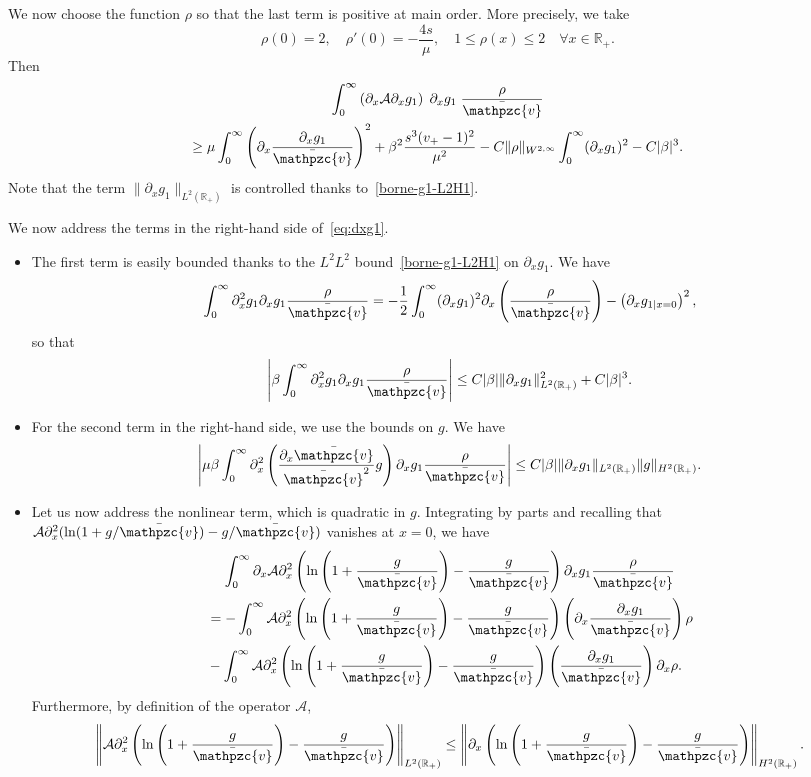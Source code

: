 \documentclass[AHL,Unicode,longabstracts,published]{cedram}
\newcommand{\R}{\mathbb{R}}
\newcommand{\p}{\partial}
\newcommand{\bv}{\bar{\mathpzc{v}}}
\newcommand{\cA}{\mathcal A}
\let\oldforall\forall
\renewcommand*{\forall}{\mathrel{\oldforall}}
\begin{document}
We now choose the function $\rho$ so that the last term is positive at main order. More precisely, we take
\[
\rho(0)=2,\quad \rho'(0)=-\frac{4s}{\mu},\quad 1\leq \rho(x)\leq 2\quad \forall x\in \R_+.
\]
Then
\begin{multline}\label{eq:diffu_pxg1}
\int_0^\infty \left(\p_x \cA \p_x g_1\right) \;\p_x g_1 \; \frac{\rho}{\bv }\\
\geq \mu \int_0^\infty \left(\p_x \frac{\p_x g_1}{\bv}\right)^2 + \beta^2\frac{s^3(v_+-1)^2}{\mu^2} - C \|\rho\|_{W^{2,\infty}}\int_0^\infty (\p_x g_1)^2 - C|\beta|^3.
\end{multline}
Note that the term $\|\p_x g_1\|_{L^2(\mathbb R_+)}$ is controlled thanks to~\eqref{borne-g1-L2H1}.


We now address the terms in the right-hand side of~\eqref{eq:dxg1}.
\begin{itemize}
\item The first term is easily bounded thanks to the $L^2 L^2$ bound~\eqref{borne-g1-L2H1} on $\p_x g_1$. We have
\[
\int_0^\infty \p_x^2 g_1 \p_x g_1 \frac{\rho}{\bv} = -\frac{1}{2}\int_0^\infty(\p_x g_1)^2 \p_x\left(\frac{\rho}{\bv}\right)-\left(\p_x g_{1|x=0}\right)^2,
\]
so that
\[
\left| \beta \int_0^\infty \p_x^2 g_1 \p_x g_1 \frac{\rho}{\bv}\right|
\leq C |\beta| \|\p_x g_1\|_{L^2(\R_+)}^2 + C |\beta|^3.
\]


\item For the second term in the right-hand side, we use the bounds on $g$. We have
\[
\left|\mu \beta \int_0^\infty \p_x^2\left(\frac{\p_x \bv}{\bv^2} g\right) \p_x g_1 \frac{\rho}{\bv}\right|\leq C |\beta|\|\p_x g_1\|_{L^2(\R_+)}\|g\|_{H^2(\R_+)}.
\]

\item Let us now address the nonlinear term, which is quadratic in $g$. Integrating by parts and recalling that $\cA\p_x^2 (\ln(1+g/\bv)- g/\bv)$ vanishes at $x=0$, we have
\begin{multline*}
 \int_0^\infty \p_x \cA \p_x^2 \left(\ln\left(1+ \frac{g}{\bv}\right) - \frac{g}{\bv}\right) \p_x g_1 \frac{\rho }{\bv}\\
\begin{aligned}
&= - \int_0^\infty \cA \p_x^2 \left(\ln\left(1+ \frac{g}{\bv}\right) - \frac{g}{\bv}\right)\left(\p_x \frac{\p_x g_1}{\bv}\right) \rho\\
&- \int_0^\infty \cA \p_x^2 \left(\ln\left(1+ \frac{g}{\bv}\right) - \frac{g}{\bv}\right)\left(\frac{\p_x g_1}{\bv}\right) \p_x \rho.
\end{aligned}
\end{multline*}
Furthermore, by definition of the operator $\cA$,
\[
\left\| \cA \p_x^2 \left(\ln\left(1+ \frac{g}{\bv}\right) - \frac{g}{\bv}\right)\right\|_{L^2(\mathbb R_+)}
\leq \left\| \p_x \left(\ln\left(1+ \frac{g}{\bv}\right) - \frac{g}{\bv}\right)\right\|_{H^2(\R_+)}.
\]


\end{itemize}
\end{document}
